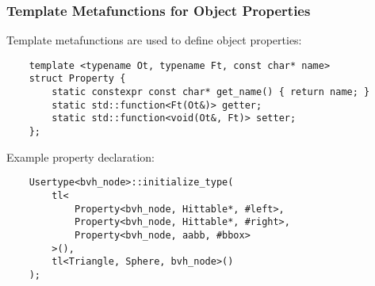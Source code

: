 \begin{frame}[fragile]
    \frametitle{Template Metafunctions for Object Properties}
    
    Template metafunctions are used to define object properties:
    
    \begin{lstlisting}
    template <typename Ot, typename Ft, const char* name>
    struct Property {
        static constexpr const char* get_name() { return name; }
        static std::function<Ft(Ot&)> getter;
        static std::function<void(Ot&, Ft)> setter;
    };
    \end{lstlisting}
    \pause
    Example property declaration:
    \begin{lstlisting}
    Usertype<bvh_node>::initialize_type(
        tl<
            Property<bvh_node, Hittable*, #left>,
            Property<bvh_node, Hittable*, #right>,
            Property<bvh_node, aabb, #bbox>
        >(),
        tl<Triangle, Sphere, bvh_node>()
    );
    \end{lstlisting}
\end{frame}